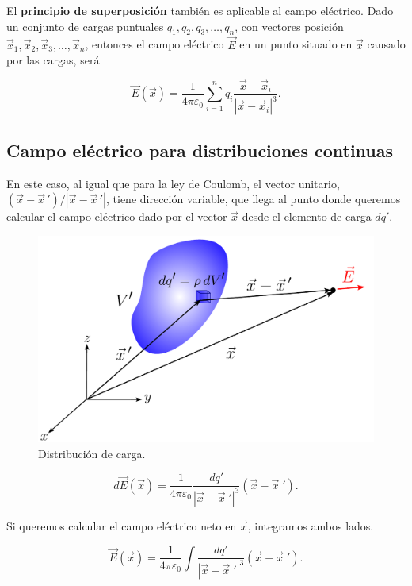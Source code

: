 El \textbf{principio de superposición} también es aplicable al campo eléctrico. Dado un conjunto de cargas puntuales $q_1,q_2, q_3, \dots, q_n$, con vectores posición $\vec{x}_1, \vec{x}_2, \vec{x}_3, \dots , \vec{x}_n$, entonces el campo eléctrico $\vec{E}$ en un punto situado en $\vec{x}$ causado por las cargas, será
\begin{shaded}
$$\vec{E}(\vec{x}) = \frac{1}{4\pi\varepsilon_0} \sum_{i=1}^n q_i \frac{\vec{x} - \vec{x}_i}{|\vec{x} - \vec{x}_i|^3}.$$
\end{shaded}

\subsection{Campo eléctrico para distribuciones continuas}

En este caso, al igual que para la ley de Coulomb, el vector unitario, $(\vec{x} - \vec{x}\,')/|\vec{x} - \vec{x}\,'|$, tiene dirección variable, que llega al punto donde queremos calcular el campo eléctrico dado por el vector $\vec{x}$ desde el elemento de carga $dq'$.

\begin{figure}[H]
    \centering
    \includegraphics[scale = 0.6]{Figuras/Distribucion-Cargas-E.pdf}
    \caption{Distribución de carga.}
    \label{fig:Distribu-Carga2}
\end{figure}

\begin{equation*}
d\vec{E}(\vec{x}) = \frac{1}{4\pi \varepsilon_0} \frac{dq'}{|\vec{x} - \vec{x}\;'|^3} (\vec{x} - \vec{x}\;').
\end{equation*}

Si queremos calcular el campo eléctrico neto en $\vec{x}$, integramos ambos lados.
\begin{shaded}
    $$\vec{E}(\vec{x}) = \frac{1}{4\pi \varepsilon_0} \int \frac{dq'}{|\vec{x} - \vec{x}\;'|^3} (\vec{x} - \vec{x}\;').$$
\end{shaded}

